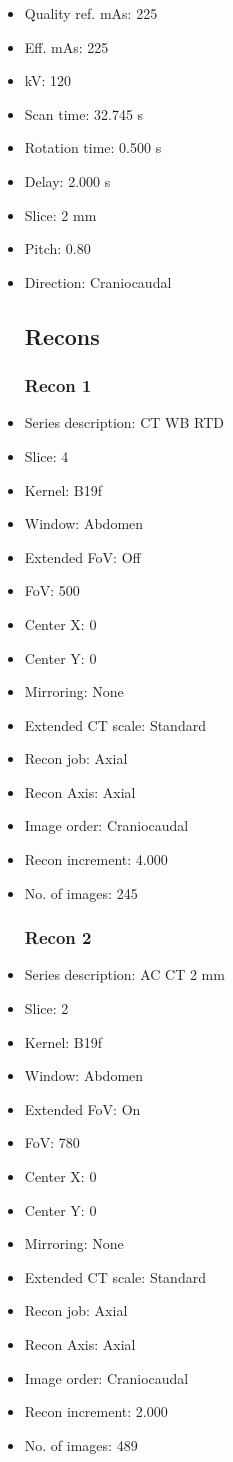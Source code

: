\documentclass[12pt]{article}
\begin{document}
\begin{itemize}[noitemsep]
\subsection{Scan}
\item Quality ref. mAs: 225\item Eff. mAs: 225\item kV: 120\item Scan time: 32.745 s\item Rotation time: 0.500 s\item Delay: 2.000 s\item Slice: 2 mm\item Pitch: 0.80\item Direction: Craniocaudal\subsection{Recons}

\subsubsection{Recon 1}
\item Series description: CT WB RTD
\item Slice: 4
\item Kernel: B19f
\item Window: Abdomen
\item Extended FoV: Off
\item FoV: 500
\item Center X: 0
\item Center Y: 0
\item Mirroring: None
\item Extended CT scale: Standard
\item Recon job: Axial
\item Recon Axis: Axial
\item Image order: Craniocaudal
\item Recon increment: 4.000
\item No. of images: 245
\subsubsection{Recon 2}
\item Series description: AC CT 2 mm
\item Slice: 2
\item Kernel: B19f
\item Window: Abdomen
\item Extended FoV: On
\item FoV: 780
\item Center X: 0
\item Center Y: 0
\item Mirroring: None
\item Extended CT scale: Standard
\item Recon job: Axial
\item Recon Axis: Axial
\item Image order: Craniocaudal
\item Recon increment: 2.000
\item No. of images: 489

\end{itemize}
\end{document}
